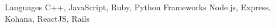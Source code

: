 \begin{cvskills}
  \cvskill
    {Languages}
    {
	C++, JavaScript,  Ruby, Python 
    }
\cvskill
    {Frameworks}
    {
	 Node.js, Express, Kohana, ReactJS, Rails
    }
	
\end{cvskills}



